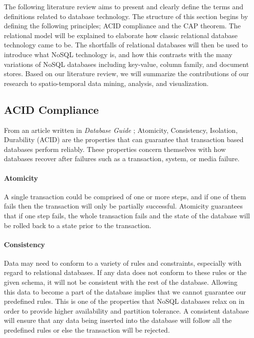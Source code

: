 The following literature review aims to present and clearly define the terms and definitions related to database technology. The structure of this section begins by defining the following principles; ACID compliance and the CAP theorem. The relational model will be explained to elaborate how classic relational database technology came to be. The shortfalls of relational databases will then be used to introduce what NoSQL technology is, and how this contrasts with the many variations of NoSQL databases including key-value, column family, and document stores. Based on our literature review, we will summarize the contributions of our research to spatio-temporal data mining, analysis, and visualization.

\subsection{ACID Compliance}
\label{sec:acid}

From an article written in \emph{Database Guide} \cite{acid}; Atomicity, Consistency, Isolation, Durability (ACID) are the properties that can guarantee that transaction based databases perform reliably. These properties concern themselves with how databases recover after failures such as a transaction, system, or media failure.

\paragraph{Atomicity}
A single transaction could be comprised of one or more steps, and if one of them fails then the transaction will only be partially successful. Atomicity guarantees that if one step fails, the whole transaction fails and the state of the database will be rolled back to a state prior to the transaction.

\paragraph{Consistency}
Data may need to conform to a variety of rules and constraints, especially with regard to relational databases. If any data does not conform to these rules or the given schema, it will not be consistent with the rest of the database. Allowing this data to become a part of the database implies that we cannot guarantee our predefined rules. This is one of the properties that NoSQL databases relax on in order to provide higher availability and partition tolerance. A consistent database will ensure that any data being inserted into the database will follow all the predefined rules or else the transaction will be rejected.


